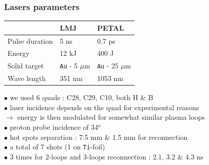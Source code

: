 \documentclass{beamer}
\begin{document}
\begin{frame}
\frametitle{Lasers parameters}

\begin{center}
\begin{tabular}{lll}
\hline
\hline
\hspace{1.0cm} & LMJ\hspace{2.0cm}  & PETAL\hspace{1.0cm}  \\
\hline
Pulse duration             & 5 ns                    & 0.7 ps \\
Energy                     & 12 kJ                   & 400 J \\
Solid target               & \texttt{Au} - 5 $\mu$m  & \texttt{Au} - 25 $\mu$m \\
Wave length                & 351 nm                  & 1053 nm \\
\hline
\hline
\end{tabular}
\end{center}

\bigskip

$\bullet$ we used 6 quads : C28, C29, C10, both H \& B \\
$\bullet$ laser incidence depends on the quad for experimental reasons  \\
$\to$ energy is then modulated for somewhat similar plasma loops \\
$\bullet$ proton probe incidence of 34$^o$ \\
$\bullet$ hot spots separation : 7.5 mm \& 1.5 mm for reconnection \\
$\bullet$ a total of 7 shots (1 on \texttt{Ti}-foil) \\
$\bullet$ 3 times for 2-loops and 3-loops reconnection : 2.1, 3.2 \& 4.3 ns \\

\end{frame}
\end{document}
